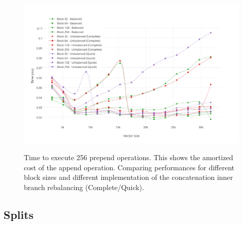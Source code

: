 \begin{figure}[h!]
  \centering
  \includegraphics[width=\textwidth]{Benchmarks/Prepend_block.pdf}
  \label{PrependBenchmarks}
  \caption{Time to execute 256 prepend operations. This shows the amortized cost of the append operation. Comparing performances for different block sizes and different implementation of the concatenation inner branch rebalancing (Complete/Quick).}
\end{figure}


\subsection{Splits}

